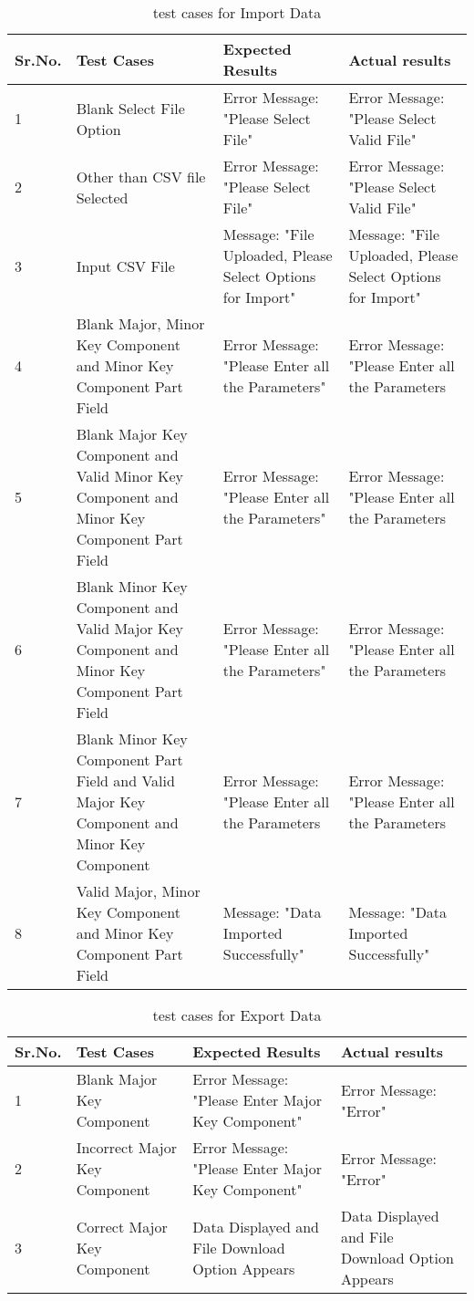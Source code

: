 \begin{table}[h]
\begin{flushleft}
\caption{test cases for Import Data}\label{test cases for Import Data}
\begin{tabular}{|p{1cm}|p{4cm}|p{4cm}|p{5cm}|} \hline
Sr.No. & Test Cases & Expected Results & Actual results \\ \hline
1 & Blank Select File Option & Error Message: "Please Select File" & Error Message: "Please Select Valid File"\\	 \hline
2 & Other than CSV file Selected & Error Message: "Please Select File" & Error Message: "Please Select Valid File"\\	 \hline
3 & Input CSV File & Message: "File Uploaded, Please Select Options for Import" & Message: "File Uploaded, Please Select Options for Import"\\	 \hline
4 & Blank Major, Minor Key Component and Minor Key Component Part Field & Error Message: "Please Enter all the Parameters" & Error Message: "Please Enter all the Parameters\\	 \hline
5 & Blank Major Key Component and Valid Minor Key Component and Minor Key Component Part Field & Error Message: "Please Enter all the Parameters" & Error Message: "Please Enter all the Parameters\\	 \hline
6 & Blank Minor Key Component and Valid Major Key Component and Minor Key Component Part Field & Error Message: "Please Enter all the Parameters" & Error Message: "Please Enter all the Parameters\\	 \hline
7 & Blank Minor Key Component Part Field and Valid Major Key Component and Minor Key Component & Error Message: "Please Enter all the Parameters & Error Message: "Please Enter all the Parameters\\	 \hline
8 & Valid Major, Minor Key Component and Minor Key Component Part Field & Message: "Data Imported Successfully" & Message: "Data Imported Successfully"\\	 \hline
\end{tabular}
\end{flushleft}
\end{table}

\begin{table}[t]
\begin{flushleft}
\caption{test cases for Export Data}\label{test cases for Export Data}
\begin{tabular}{|p{1cm}|p{4cm}|p{4cm}|p{5cm}|} \hline
Sr.No. & Test Cases & Expected Results & Actual results \\ \hline
1 & Blank Major Key Component & Error Message: "Please Enter Major Key Component" & Error Message: "Error"\\	 \hline
2 & Incorrect Major Key Component & Error Message: "Please Enter Major Key Component" & Error Message: "Error"\\	 \hline
3 & Correct Major Key Component & Data Displayed and File Download Option Appears & Data Displayed and File Download Option Appears\\	 \hline
\end{tabular}
\end{flushleft}
\end{table}
